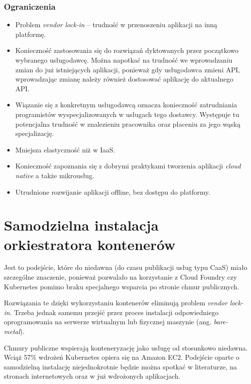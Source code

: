 \documentclass[12pt,a4paper,twoside,titlepage,openright]{book}
\begin{document}
\subsubsection{Ograniczenia}
\begin{itemize}
\item Problem \textit{vendor lock-in} -- trudność w przenoszeniu aplikacji na inną platformę.
\item Konieczność zastosowania się do rozwiązań dyktowanych przez początkowo wybranego usługodawcę. Można napotkać na trudność we wprowadzaniu zmian do już istniejących aplikacji, ponieważ gdy usługodawca zmieni API, wprowadzając zmianę należy również dostosować aplikację do aktualnego API.
\item Wiązanie się z konkretnym usługodawcą oznacza konieczność zatrudniania programistów wyspecjalizowanych w usługach tego dostawcy. Występuje tu potencjalna trudność w znalezieniu pracownika oraz płaceniu za jego wąską specjalizację.
\item Mniejsza elastyczność niż w IaaS.
\item Konieczność zapoznania się z dobrymi praktykami tworzenia aplikacji \textit{cloud native} a także mikrousług.
\item Utrudnione rozwijanie aplikacji offline, bez dostępu do platformy.
\end{itemize}

\section{Samodzielna instalacja orkiestratora kontenerów}\label{section:instalujKontenery}

Jest to podejście, które do niedawna (do czasu publikacji usług typu CaaS) miało szczególne znaczenie, ponieważ pozwalało na korzystanie z Cloud Foundry czy Kubernetes pomimo braku specjalnego wsparcia po stronie chmur publicznych. 

Rozwiązania te dzięki wykorzystaniu kontenerów eliminują problem \textit{vendor lock-in}. Trzeba jednak samemu przejść przez proces instalacji odpowiedniego oprogramowania na serwerze wirtualnym lub fizycznej maszynie (ang. \textit{bare-metal}).

Chmury publiczne wspierają konteneryzację jako usługę od stosunkowo niedawna. Wciąż 57\% wdrożeń Kubernetes opiera się na Amazon EC2. Podejście oparte o samodzielną instalację niejednokrotnie będzie można spotkać w literaturze, na stronach internetowych oraz w już wdrożonych aplikacjach.
\end{document}
